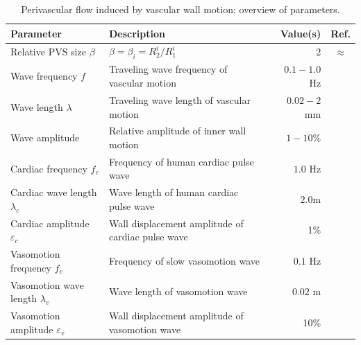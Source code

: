 \begin{table}
  \small
  \begin{tabular}{llrc}
    \toprule
    Parameter & Description & Value(s)  & Ref.\\ 
    \midrule
    Relative PVS size $\beta$ & $\beta = \beta_i = R_2^i / R_1^i$ & 2 & $\approx$\cite{eide2024functional} \\
    Wave frequency $f$ & Traveling wave frequency of vascular motion & $0.1-1.0$ Hz & \discuss{\cite{gjerde2023directional}} \\
    Wave length $\lambda$ & Traveling wave length of vascular motion & $0.02-2$ mm & \discuss{\cite{broggini2024long, gjerde2023directional}} \\
    Wave amplitude & Relative amplitude of inner wall motion & $1-10\%$ & \discuss{\cite{gjerde2023directional}} \\
    \midrule
    Cardiac frequency $f_c$ & Frequency of human cardiac pulse wave  & $1.0$ Hz & \cite{jung2021novel} \\
    Cardiac wave length $\lambda_c$ & Wave length of human cardiac pulse wave & $2.0$m & \\
    Cardiac amplitude $\varepsilon_c$ & Wall displacement amplitude of cardiac pulse wave & 1\%  & \\
    \midrule
    Vasomotion frequency $f_v$ & Frequency of slow vasomotion wave  & $0.1$ Hz & \cite{jung2021novel} \\
    Vasomotion wave length $\lambda_v$ & Wave length of vasomotion wave & $0.02$ m & \cite{broggini2024long, gjerde2023directional} \\
    Vasomotion amplitude $\varepsilon_v$ & Wall displacement amplitude of vasomotion wave & 10\%  & \cite{broggini2024long, gjerde2023directional}\\
    \bottomrule
  \end{tabular}
  \caption{Perivascular flow induced by vascular wall motion: overview of parameters.}
  \label{tab:pvs:parameters}
\end{table}

